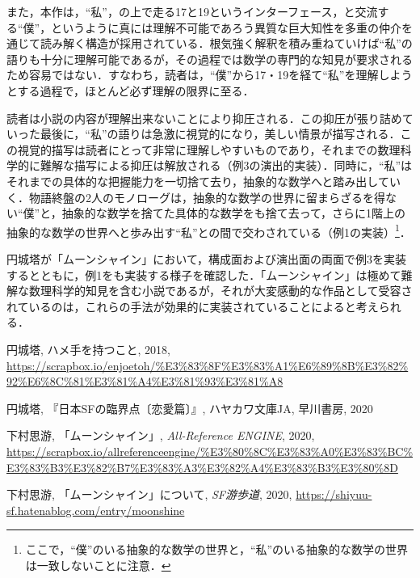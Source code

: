 \documentclass[10pt, a5paper, twoside]{jsarticle}
\theoremstyle{definition}
\begin{document}
		また，本作は，“私”，の上で走る17と19というインターフェース，と交流する“僕”，というように真には理解不可能であろう異質な巨大知性を多重の仲介を通じて読み解く構造が採用されている．根気強く解釈を積み重ねていけば“私”の語りも十分に理解可能であるが，その過程では数学の専門的な知見が要求されるため容易ではない．すなわち，読者は，“僕”から17・19を経て“私”を理解しようとする過程で，ほとんど必ず理解の限界に至る．

		読者は小説の内容が理解出来ないことにより抑圧される．この抑圧が張り詰めていった最後に，“私”の語りは急激に視覚的になり，美しい情景が描写される．この視覚的描写は読者にとって非常に理解しやすいものであり，それまでの数理科学的に難解な描写による抑圧は解放される（例3の演出的実装）．同時に，“私”はそれまでの具体的な把握能力を一切捨て去り，抽象的な数学へと踏み出していく．物語終盤の2人のモノローグは，抽象的な数学の世界に留まらざるを得ない“僕”と，抽象的な数学を捨てた具体的な数学をも捨て去って，さらに1階上の抽象的な数学の世界へと歩み出す“私”との間で交わされている（例1の実装）\footnote{ここで，“僕”のいる抽象的な数学の世界と，“私”のいる抽象的な数学の世界は一致しないことに注意．}．

		円城塔が「ムーンシャイン」において，構成面および演出面の両面で例3を実装するとともに，例1をも実装する様子を確認した．「ムーンシャイン」は極めて難解な数理科学的知見を含む小説であるが，それが大変感動的な作品として受容されているのは，これらの手法が効果的に実装されていることによると考えられる．		

	\begin{thebibliography}{99}

		 円城塔, ハメ手を持つこと, 2018, \url{https://scrapbox.io/enjoetoh/%E3%83%8F%E3%83%A1%E6%89%8B%E3%82%92%E6%8C%81%E3%81%A4%E3%81%93%E3%81%A8}

		 円城塔, 『日本SFの臨界点〔恋愛篇〕』, ハヤカワ文庫JA, 早川書房, 2020

		 下村思游, 「ムーンシャイン」, \textit{All-Reference ENGINE}, 2020, \url{https://scrapbox.io/allreferenceengine/%E3%80%8C%E3%83%A0%E3%83%BC%E3%83%B3%E3%82%B7%E3%83%A3%E3%82%A4%E3%83%B3%E3%80%8D}

		 下村思游, 「ムーンシャイン」について, \textit{SF游歩道}, 2020, \url{https://shiyuu-sf.hatenablog.com/entry/moonshine}

	\end{thebibliography}
\end{document}
